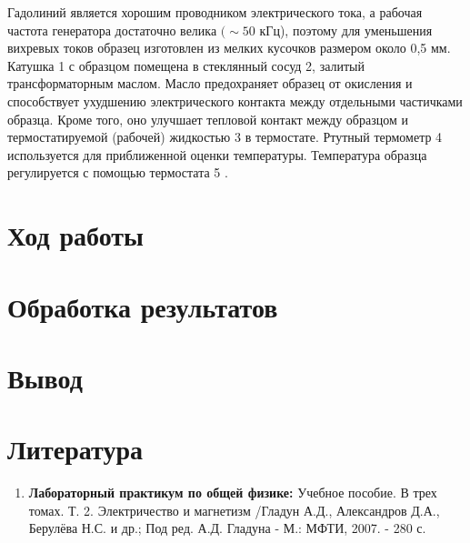 \documentclass[a4paper, 12pt]{article}%
\begin{document}
Гадолиний является хорошим проводником электрического тока, а рабочая частота генератора достаточно велика $(\sim 50$ кГц), поэтому для уменьшения вихревых токов образец изготовлен из мелких кусочков размером около 0,5 мм. Катушка 1 с образцом помещена в стеклянный сосуд 2, залитый трансформаторным маслом. Масло предохраняет образец от окисления и способствует ухудшению электрического контакта между отдельными частичками образца. Кроме того, оно улучшает тепловой контакт между образцом и термостатируемой (рабочей) жидкостью 3 в термостате. Ртутный термометр 4 используется для приближенной оценки температуры. Температура образца регулируется с помощью термостата 5 .


\section{Ход работы}


\section{Обработка результатов}


\section{Вывод}
 
\section{Литература}

\begin{enumerate}

\item \textbf{Лабораторный практикум по общей физике:} Учебное пособие. В трех томах. Т. 2. Электричество и магнетизм /Гладун А.Д., Александров Д.А., Берулёва Н.С. и др.; Под ред. А.Д. Гладуна - М.: МФТИ, 2007. - 280 с.

\end{enumerate}		
		
\end{document}
